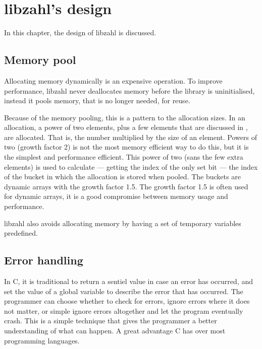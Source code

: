 \chapter{libzahl's design}
\label{chap:libzahl's design}

In this chapter, the design of libzahl is discussed.

\vspace{1cm}
\minitoc


\newpage
\section{Memory pool}
\label{sec:Memory pool}

Allocating memory dynamically is an expensive operation.
To improve performance, libzahl never deallocates memory
before the library is uninitialised, instead it pools
memory, that is no longer needed, for reuse.

Because of the memory pooling, this is a pattern to the
allocation sizes. In an allocation, a power of two
elements, plus a few elements that are discussed in
, are allocated. That is,
the number multiplied by the size of an element.
Powers of two (growth factor 2) is not the most memory
efficient way to do this, but it is the simplest and
performance efficient. This power of two (sans the few
extra elements) is used to calculate — getting the index
of the only set bit — the index of the bucket in
which the allocation is stored when pooled. The buckets
are dynamic arrays with the growth factor 1.5. The
growth factor 1.5 is often used for dynamic arrays, it
is a good compromise between memory usage and performance.

libzahl also avoids allocating memory by having a set
of temporary variables predefined.


\newpage
\section{Error handling}
\label{sec:Error handling}

In C, it is traditional to return a sentiel value
in case an error has occurred, and set the value
of a global variable to describe the error that
has occurred. The programmer can choose whether to
check for errors, ignore errors where it does not
matter, or simple ignore errors altogether and let
the program eventually crash. This is a simple
technique that gives the programmer a better
understanding of what can happen. A great advantage
C has over most programming languages.

